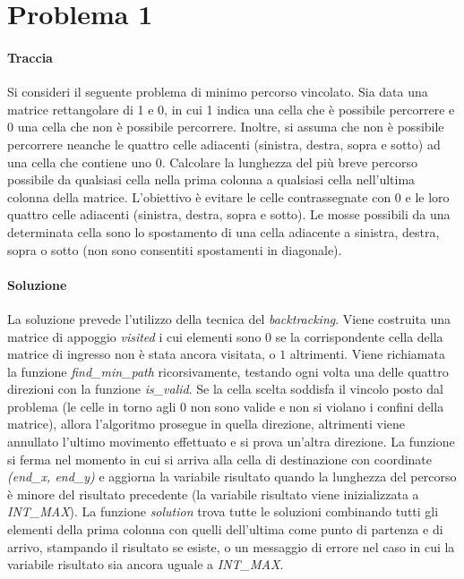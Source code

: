 \documentclass{article}
\begin{document}

\thispagestyle{empty}
\newpage

\section{Problema 1}
\paragraph{Traccia} Si consideri il seguente problema di minimo percorso vincolato. Sia data una matrice
rettangolare di 1 e 0, in cui 1 indica una cella che è possibile percorrere e 0 una cella che
non è possibile percorrere. Inoltre, si assuma che non è possibile percorrere neanche le
quattro celle adiacenti (sinistra, destra, sopra e sotto) ad una cella che contiene uno 0.
Calcolare la lunghezza del più breve percorso possibile da qualsiasi cella nella prima
colonna a qualsiasi cella nell'ultima colonna della matrice. L’obiettivo è evitare le celle
contrassegnate con 0 e le loro quattro celle adiacenti (sinistra, destra, sopra e sotto).
Le mosse possibili da una determinata cella sono lo spostamento di una cella adiacente a
sinistra, destra, sopra o sotto (non sono consentiti spostamenti in diagonale).

\paragraph{Soluzione}

La soluzione prevede l'utilizzo della tecnica del \textit{backtracking}. Viene costruita una matrice di appoggio \textit{visited} i cui elementi sono $0$ se la corrispondente cella della matrice di ingresso non è stata ancora visitata, o $1$ altrimenti. Viene richiamata la funzione \textit{find\_min\_path} ricorsivamente, testando ogni volta una delle quattro direzioni con la funzione \textit{is\_valid}. Se la cella scelta soddisfa il vincolo posto dal problema (le celle in torno agli $0$ non sono valide e non si violano i confini della matrice), allora l'algoritmo prosegue in quella direzione, altrimenti viene annullato l'ultimo movimento effettuato e si prova un'altra direzione.
La funzione si ferma nel momento in cui si arriva alla cella di destinazione con coordinate \textit{(end\_x, end\_y)} e aggiorna la variabile risultato quando la lunghezza del percorso è minore del risultato precedente (la variabile risultato viene inizializzata a \textit{INT\_MAX}).
La funzione \textit{solution} trova tutte le soluzioni combinando tutti gli elementi della prima colonna con quelli dell'ultima come punto di partenza e di arrivo, stampando il risultato se esiste, o un messaggio di errore nel caso in cui la variabile risultato sia ancora uguale a \textit{INT\_MAX}.
\end{document}
